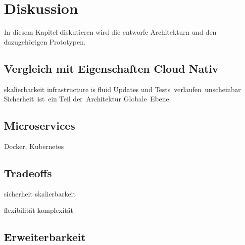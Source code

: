\chapter{Diskussion}
In diesem Kapitel diskutieren wird die entworfe Architekturn und den dazugehörigen Prototypen.

\section{Vergleich mit Eigenschaften Cloud Nativ}
skalierbarkeit
infrastructure is fluid
Updates und Tests verlaufen unscheinbar
Sicherheit ist ein Teil der Architektur
Globale Ebene

\section{Microservices}
 Docker, Kubernetes
 
\section{Tradeoffs}
sicherheit skalierbarkeit

flexibilität komplexität

\section{Erweiterbarkeit}
